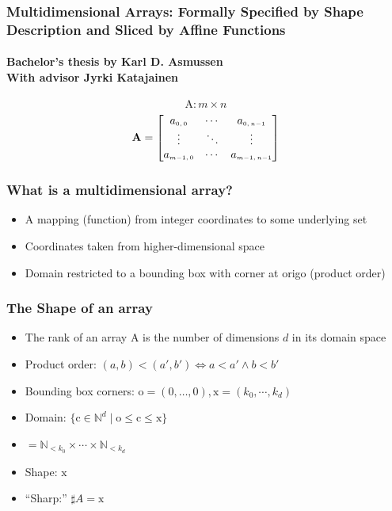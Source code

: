 \documentclass[xetex,mathserif,serif]{beamer}
\newcommand\mrm[1]{\mathrm{#1}}
\newcommand\brm[1]{\bm{\mrm{#1}}}
\newcommand\Nat{\mathbb{N}}
\begin{document}
\begin{frame}
  \frametitle{Multidimensional Arrays: Formally Specified by Shape Description and Sliced by Affine Functions}
  \framesubtitle{Bachelor's thesis by Karl D. Asmussen \\
  With advisor Jyrki Katajainen}
  
  \[
    \bm{\mathrm{A}} : m \times n
  \]
  \[ \bm{\mathrm{A}}=
      \begin{bmatrix}
        a_{\text{\tiny$0,0$}} & \cdots & a_{\text{\tiny$0,n{-}1$}} \\
        \vdots & \ddots & \vdots \\
        a_{\text{\tiny$m{-}1,0$}} & \cdots & a_{\text{\tiny$m{-}1,n{-}1$}}
      \end{bmatrix}
  \]
\end{frame}

\begin{frame}
  \frametitle{What is a multidimensional array?}
  \begin{itemize}[<+->]
    \item A mapping (function) from integer coordinates to some underlying set
    \item Coordinates taken from higher-dimensional space
    \item Domain restricted to a bounding box with corner at origo (product order)
  \end{itemize}
\end{frame}

\begin{frame}
  \frametitle{The Shape of an array}
  \begin{itemize}[<+->]
    \item The rank of an array $\brm A$ is the number of dimensions $d$ in its domain space
    \item Product order: $(a, b) < (a', b') \iff a < a' \land b < b'$
    \item Bounding box corners: $\brm o = (0, \dots, 0), \brm x = (k_0, \cdots, k_d)$
    \item Domain: $\{\brm c \in \Nat^d \mid \brm o \le \brm c \le \brm x\}$
    \item $= \Nat_{<k_0} \times \cdots \times \Nat_{<k_d}$
    \item Shape: $\brm x$
    \item ``Sharp:'' $\sharp A = \brm x$
  \end{itemize}
\end{frame}
\end{document}

